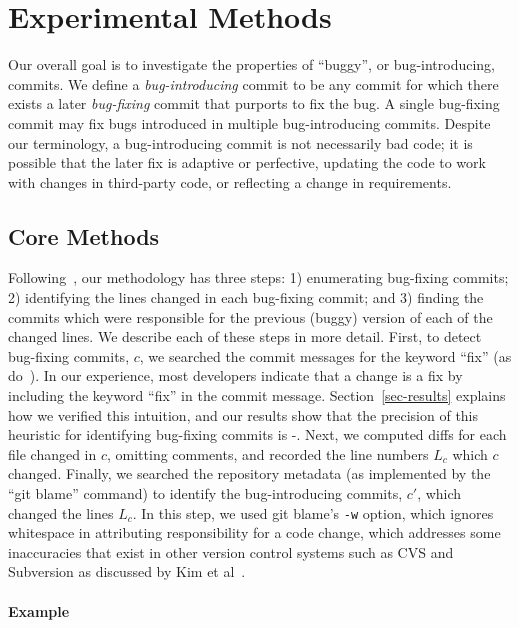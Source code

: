 \section{Experimental Methods}
\label{sec:method}

Our overall goal is to investigate the properties of ``buggy'', or
bug-introducing, commits. We define a \emph{bug-introducing} commit to be any
commit for which there exists a later \emph{bug-fixing} commit that purports to
fix the bug. A single bug-fixing commit may fix bugs introduced in multiple
bug-introducing commits. Despite our terminology, a bug-introducing commit is
not necessarily bad code; it is possible that the later fix is adaptive or
perfective, updating the code to work with changes in third-party code, or
reflecting a change in requirements.

\subsection{Core Methods}

Following~\cite{sliwerski-msr-2005}, our methodology has three steps: 1)
enumerating bug-fixing commits; 2) identifying the lines changed in each
bug-fixing commit; and 3) finding the commits which were responsible for the
previous (buggy) version of each of the changed lines. We describe each of these
steps in more detail. First, to detect bug-fixing commits, $c$, we searched the
commit messages for the keyword ``fix'' (as do~\cite{smallCommits05}).  In our
experience, most developers indicate that a change is a fix by including the
keyword ``fix'' in the commit message. Section~\ref{sec-results} explains how we
verified this intuition, and our results show that the precision of this
heuristic for identifying bug-fixing commits is \postP-\linuxP.  Next, we
computed diffs for each file changed in $c$, omitting comments, and recorded the
line numbers $L_c$ which $c$ changed. Finally, we searched the repository
metadata (as implemented by the ``git blame'' command) to identify the
bug-introducing commits, $c'$, which changed the lines $L_c$. In this step, we
used git blame's {\tt -w} option, which ignores whitespace in attributing
responsibility for a code change, which addresses some inaccuracies that exist
in other version control systems such as CVS and Subversion as discussed by Kim
et al~\cite{2006-automatic}.

\paragraph{Example}

